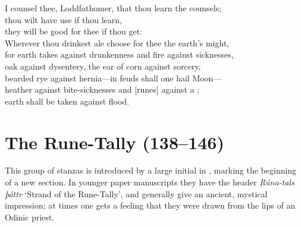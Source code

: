 \bvg\bva{}%
\eva

\bvb I counsel thee, Loddfathomer, that thou learn the counsels; \\
\ind thou wilt have use if thou learn, \\
\ind they will be good for thee if thou get: \\
Wherever thou drinkest ale choose for thee the earth’s might, \\
for earth takes against drunkenness and fire against sicknesses, \\
oak against dysentery, the ear of corn against sorcery, \\
bearded rye against hernia—in feuds shall one hail Moon— \\
heather against bite-sicknesses and [runes] against a ; \\
\ind earth shall be taken against flood.\evb\evg

\sectionline

\section{The Rune-Tally (138–146)}

This group of stanzas is introduced by a large initial in \Regius, marking the beginning of a new section.  In younger paper manuscripts they have the header \emph{Rúna-tals þáttr} ‘Strand of the Rune-Tally’, and generally give an ancient, mystical impression; at times one gets a feeling that they were drawn from the lips of an Odinic priest.

